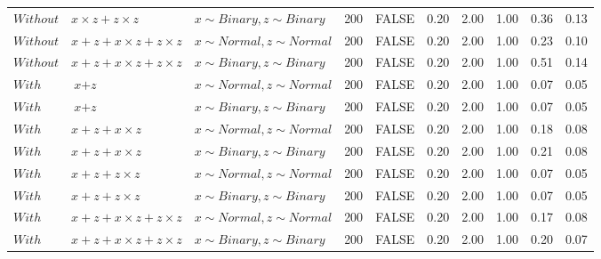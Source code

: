 \begin{table}[ht]
{\begin{tabular}{lllrlrrrrr}
  $Without$ & $\textit{x} \times \textit{z} + \textit{z} \times \textit{z}$ & $\textit{x} \sim Binary, \textit{z} \sim Binary$ & 200 & FALSE & 0.20 & 2.00 & 1.00 & 0.36 & 0.13 \\ 
  $Without$ & $\textit{x} + \textit{z} + \textit{x} \times \textit{z} + \textit{z} \times \textit{z}$ & $\textit{x} \sim Normal , \textit{z} \sim Normal$ & 200 & FALSE & 0.20 & 2.00 & 1.00 & 0.23 & 0.10 \\ 
  $Without$ & $\textit{x} + \textit{z} + \textit{x} \times \textit{z} + \textit{z} \times \textit{z}$ & $\textit{x} \sim Binary, \textit{z} \sim Binary$ & 200 & FALSE & 0.20 & 2.00 & 1.00 & 0.51 & 0.14 \\ 
  $With$ & $\textit{x} + \textit{z}$ & $\textit{x} \sim Normal , \textit{z} \sim Normal$ & 200 & FALSE & 0.20 & 2.00 & 1.00 & 0.07 & 0.05 \\ 
  $With$ & $\textit{x} + \textit{z}$ & $\textit{x} \sim Binary, \textit{z} \sim Binary$ & 200 & FALSE & 0.20 & 2.00 & 1.00 & 0.07 & 0.05 \\ 
  $With$ & $\textit{x} + \textit{z} + \textit{x} \times \textit{z}$ & $\textit{x} \sim Normal , \textit{z} \sim Normal$ & 200 & FALSE & 0.20 & 2.00 & 1.00 & 0.18 & 0.08 \\ 
  $With$ & $\textit{x} + \textit{z} + \textit{x} \times \textit{z}$ & $\textit{x} \sim Binary, \textit{z} \sim Binary$ & 200 & FALSE & 0.20 & 2.00 & 1.00 & 0.21 & 0.08 \\ 
  $With$ & $\textit{x} + \textit{z} + \textit{z} \times \textit{z}$ & $\textit{x} \sim Normal , \textit{z} \sim Normal$ & 200 & FALSE & 0.20 & 2.00 & 1.00 & 0.07 & 0.05 \\ 
  $With$ & $\textit{x} + \textit{z} + \textit{z} \times \textit{z}$ & $\textit{x} \sim Binary, \textit{z} \sim Binary$ & 200 & FALSE & 0.20 & 2.00 & 1.00 & 0.07 & 0.05 \\ 
  $With$ & $\textit{x} + \textit{z} + \textit{x} \times \textit{z} + \textit{z} \times \textit{z}$ & $\textit{x} \sim Normal , \textit{z} \sim Normal$ & 200 & FALSE & 0.20 & 2.00 & 1.00 & 0.17 & 0.08 \\ 
  $With$ & $\textit{x} + \textit{z} + \textit{x} \times \textit{z} + \textit{z} \times \textit{z}$ & $\textit{x} \sim Binary, \textit{z} \sim Binary$ & 200 & FALSE & 0.20 & 2.00 & 1.00 & 0.20 & 0.07 \\ 
   \hline
\end{tabular}
}
\end{table}
